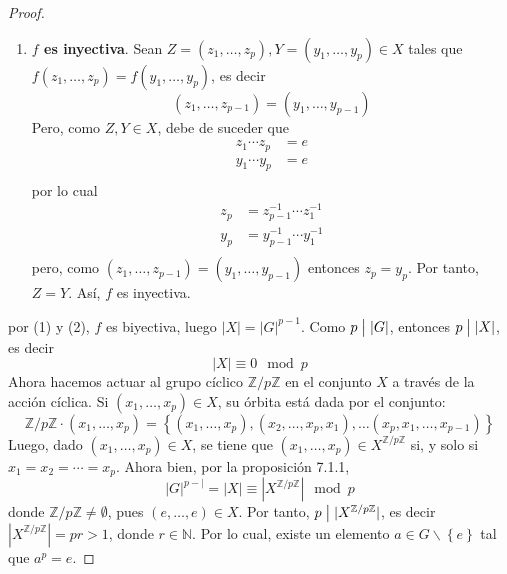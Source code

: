 \documentclass[12pt]{report}
\theoremstyle{largebreak}
\newcommand\divides{\ensuremath{\bigm|}}
\begin{document}
\begin{proof}
\begin{enumerate}
            \item \textbf{$f$ es inyectiva}. Sean $Z=(z_1,\dots,z_p),Y=(y_1,\dots,y_p)\in X$ tales que $f(z_1,\dots,z_p)=f(y_1,\dots,y_p)$, es decir
            \begin{equation*}
                (z_1,\dots,z_{p-1})=(y_1,\dots,y_{p-1})
            \end{equation*}
            Pero, como $Z,Y\in X$, debe de suceder que
            \begin{equation*}
                \begin{split}
                    z_1\cdots z_p&=e\\
                    y_1\cdots y_p&=e\\
                \end{split}
            \end{equation*}
            por lo cual
            \begin{equation*}
                \begin{split}
                    z_p&=z_{p-1}^{-1}\cdots z_1^{-1}\\
                    y_p&=y_{p-1}^{-1}\cdots y_1^{-1}\\
                \end{split}
            \end{equation*}
            pero, como $(z_1,\dots,z_{p-1})=(y_1,\dots,y_{p-1})$ entonces $z_p=y_p$. Por tanto, $Z=Y$. Así, $f$ es inyectiva.
        \end{enumerate}
        por (1) y (2), $f$ es biyectiva, luego $|X|=|G|^{p-1}$. Como $p\divides|G|$, entonces $p\divides |X|$, es decir
        \begin{equation*}
            |X|\equiv 0\mod p
        \end{equation*}
        Ahora hacemos actuar al grupo cíclico $\mathbb{Z}/p\mathbb{Z}$ en el conjunto $X$ a través de la acción cíclica. Si $(x_1,\dots,x_p)\in X$, su órbita está dada por el conjunto:
        \begin{equation*}
            \mathbb{Z}/p\mathbb{Z}\cdot(x_1,\dots,x_p)=\left\{(x_1,\dots,x_p),(x_2,\dots,x_p,x_1),\dots(x_p,x_1,\dots,x_{p-1}) \right\}
        \end{equation*}
        Luego, dado $(x_1,\dots,x_p)\in X$, se tiene que $(x_1,\dots,x_p)\in X^{\mathbb{Z}/p\mathbb{Z}}$ si, y solo si $x_1=x_2=\cdots=x_p$. Ahora bien, por la proposición 7.1.1,
        \begin{equation*}
            |G|^{p-|}=|X|\equiv|X^{\mathbb{Z}/p\mathbb{Z}}|\mod p
        \end{equation*}
        donde $\mathbb{Z}/p\mathbb{Z}\neq \emptyset$, pues $(e,\dots, e)\in X$. Por tanto, $p\divides |X^{\mathbb{Z}/p\mathbb{Z}}|$, es decir $|X^{\mathbb{Z}/p\mathbb{Z}}|=pr>1$, donde $r\in\mathbb{N}$. Por lo cual, existe un elemento $a\in G\backslash\left\{e\right\}$ tal que $a^p=e$. 
    \end{proof}
\end{document}
